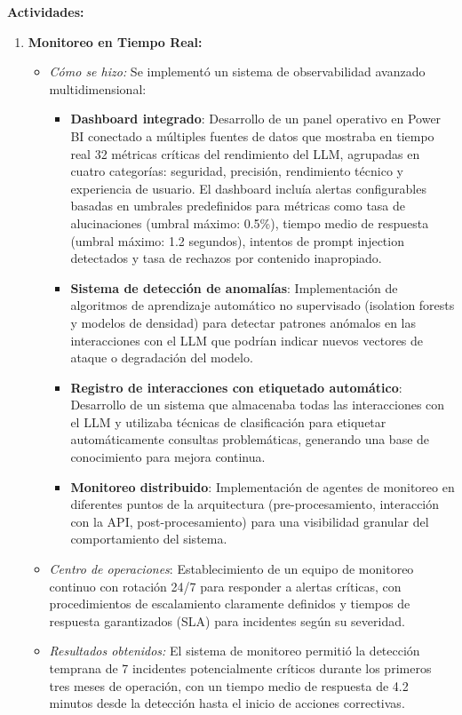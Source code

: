 \documentclass[12pt]{article}
\begin{document}
\textbf{Actividades:}
\begin{enumerate}
    \item \textbf{Monitoreo en Tiempo Real:}
        \begin{itemize}
            \item \textit{Cómo se hizo:} Se implementó un sistema de observabilidad avanzado multidimensional:
            \begin{itemize}
                \item \textbf{Dashboard integrado}: Desarrollo de un panel operativo en Power BI conectado a múltiples fuentes de datos que mostraba en tiempo real 32 métricas críticas del rendimiento del LLM, agrupadas en cuatro categorías: seguridad, precisión, rendimiento técnico y experiencia de usuario. El dashboard incluía alertas configurables basadas en umbrales predefinidos para métricas como tasa de alucinaciones (umbral máximo: 0.5\%), tiempo medio de respuesta (umbral máximo: 1.2 segundos), intentos de prompt injection detectados y tasa de rechazos por contenido inapropiado.
                \item \textbf{Sistema de detección de anomalías}: Implementación de algoritmos de aprendizaje automático no supervisado (isolation forests y modelos de densidad) para detectar patrones anómalos en las interacciones con el LLM que podrían indicar nuevos vectores de ataque o degradación del modelo.
                \item \textbf{Registro de interacciones con etiquetado automático}: Desarrollo de un sistema que almacenaba todas las interacciones con el LLM y utilizaba técnicas de clasificación para etiquetar automáticamente consultas problemáticas, generando una base de conocimiento para mejora continua.
                \item \textbf{Monitoreo distribuido}: Implementación de agentes de monitoreo en diferentes puntos de la arquitectura (pre-procesamiento, interacción con la API, post-procesamiento) para una visibilidad granular del comportamiento del sistema.
            \end{itemize}
            \item \textit{Centro de operaciones}: Establecimiento de un equipo de monitoreo continuo con rotación 24/7 para responder a alertas críticas, con procedimientos de escalamiento claramente definidos y tiempos de respuesta garantizados (SLA) para incidentes según su severidad.
            \item \textit{Resultados obtenidos:} El sistema de monitoreo permitió la detección temprana de 7 incidentes potencialmente críticos durante los primeros tres meses de operación, con un tiempo medio de respuesta de 4.2 minutos desde la detección hasta el inicio de acciones correctivas.

\end{itemize}
\end{enumerate}
\end{document}
